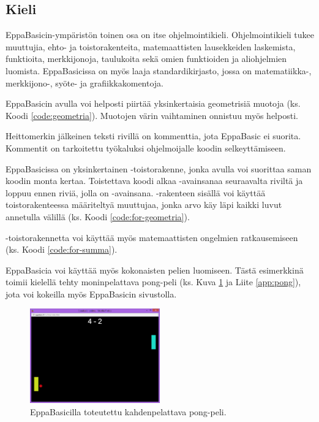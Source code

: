 \subsection{Kieli}
EppaBasicin-ympäristön toinen osa on
itse ohjelmointikieli.
Ohjelmointikieli tukee
muuttujia,
ehto- ja toistorakenteita,
matemaattisten lausekkeiden laskemista,
funktioita,
merkkijonoja,
taulukoita sekä
omien funktioiden
ja aliohjelmien luomista.
EppaBasicissa on myös
laaja standardikirjasto,
jossa on matematiikka-,
merkkijono-, syöte- ja
grafiikkakomentoja.

EppaBasicin avulla voi helposti
piirtää yksinkertaisia geometrisiä
muotoja (ks. Koodi \ref{code:geometria}).
Muotojen värin vaihtaminen
onnistuu myös helposti.

Heittomerkin  jälkeinen
teksti rivillä on kommenttia,
jota EppaBasic ei suorita.
Kommentit on tarkoitettu
työkaluksi ohjelmoijalle
koodin selkeyttämiseen.


EppaBasicissa on yksinkertainen
-toistorakenne, jonka
avulla voi suorittaa saman
koodin monta kertaa.
Toistettava koodi alkaa
-avainsanaa seuraavalta
riviltä ja loppuu ennen riviä,
jolla on -avainsana.
-rakenteen sisällä voi
käyttää toistorakenteessa määriteltyä
muuttujaa, jonka arvo käy läpi
kaikki luvut annetulla välillä
(ks. Koodi \ref{code:for-geometria}).


-toistorakennetta voi
käyttää myös matemaattisten 
ongelmien ratkausemiseen
(ks. Koodi \ref{code:for-summa}).


EppaBasicia voi käyttää myös
kokonaisten pelien luomiseen.
Tästä esimerkkinä toimii
kielellä tehty moninpelattava
pong-peli
(ks. Kuva \ref{img:pong} ja Liite \ref{app:pong}),
jota voi kokeilla myös
EppaBasicin sivustolla.

\begin{figure}[h]
    \centering
    \includegraphics[width=0.5\textwidth]{pong}
    \caption{EppaBasicilla toteutettu kahdenpelattava pong-peli.}
    \label{img:pong}
\end{figure}